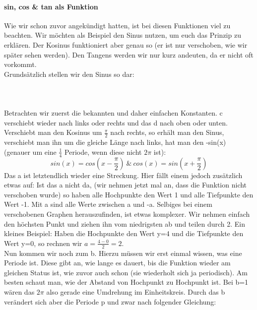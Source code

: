 		\paragraph{sin, cos \& tan als Funktion}
			Wie wir schon zuvor angekündigt hatten, ist bei diesen Funktionen viel zu
			beachten. Wir möchten als Beispiel den Sinus nutzen, um euch das Prinzip zu
			erklären. Der Kosinus funktioniert aber genau so (er ist nur verschoben, wie
			wir später sehen werden). Den Tangens werden wir nur kurz andeuten, da er
			nicht oft vorkommt.\\
			Grundsätzlich stellen wir den Sinus so dar:
			\\ \\
			\formel{\[f(x)=a\cdot sin(b(x-c))+d\]}
			\\ \\
			Betrachten wir zuerst die bekannten und daher einfachen Konstanten. c
			verschiebt wieder nach links oder rechts und das d nach oben oder unten.
			Verschiebt man den Kosinus um \(\frac{\pi}{2}\) nach rechts, so erhält man
			den Sinus, verschiebt man ihn um die gleiche Länge nach links, hat man den
			-sin(x) (genauer um eine \(\frac{1}{4}\) Periode, wenn diese nicht \(2 \pi\)
			ist):
			\[sin(x)=cos(x-\frac{\pi}{2})\ \&\ cos(x)=sin(x+\frac{\pi}{2})\]
			 Das a ist letztendlich wieder eine Streckung. Hier fällt einem jedoch
			 zusätzlich etwas auf: Ist das a nicht da, (wir nehmen jetzt mal an, dass die
			 Funktion nicht verschoben wurde) so haben alle Hochpunkte den Wert 1 und
			 alle Tiefpunkte den Wert -1. Mit a sind alle Werte zwischen a und -a.
			 Selbiges bei einem verschobenen Graphen herauszufinden, ist etwas komplexer.
			 Wir nehmen einfach den höchsten Punkt und ziehen ihn vom niedrigsten ab und
			 teilen durch 2. Ein kleines Beispiel: Haben die Hochpunkte den Wert y=4 und
			 die Tiefpunkte den Wert y=0, so rechnen wir \(a=\frac{4-0}{2}=2\).\\
 			Nun kommen wir noch zum b. Hierzu müssen wir erst einmal wissen, was eine
 			Periode ist. Diese gibt an, wie lange es dauert, bis die Funktion wieder am
			 gleichen Status ist, wie zuvor auch schon (sie wiederholt sich ja
			 periodisch).
			 Am besten schaut man, wie der Abstand von Hochpunkt zu Hochpunkt ist. Bei
			 b=1 wären das \(2\pi\) also gerade eine Umdrehung im Einheitskreis. Durch
			 das b verändert sich aber die Periode p und zwar nach folgender Gleichung:
			 \\ \\
